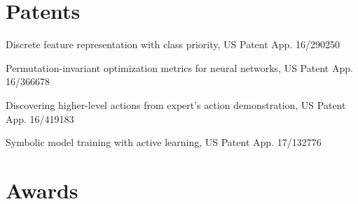 \documentclass[letterpaper,11pt]{article}
\begin{document}
\begin{CV}

\end{CV}


\renewcommand{\refname}{Selected Publications}

{
\let\uline\relax
\nocite{Asai2022}
\nocite{Asai2022b}
\nocite{Asai2022c}
\nocite{Asai2021}
\nocite{Asai2020}
\nocite{Asai2020b}
\nocite{Asai2020c}
\nocite{Asai2019a}
\nocite{Asai2019b}
\nocite{Asai2018}
\nocite{Asai2017e}
\nocite{Asai2017b}
\nocite{Asai2017}
\nocite{Asai2016b}
\nocite{Asai2016}
\nocite{Asai2015}
\nocite{Asai2014}




}

\section{Patents}

\begin{CV}
 \item Discrete feature representation with class priority, US Patent App. 16/290250
 \item Permutation-invariant optimization metrics for neural networks, US Patent App. 16/366678
 \item Discovering higher-level actions from expert's action demonstration, US Patent App. 16/419183
 \item Symbolic model training with active learning, US Patent App. 17/132776
\end{CV}

\section{Awards}
\end{document}

